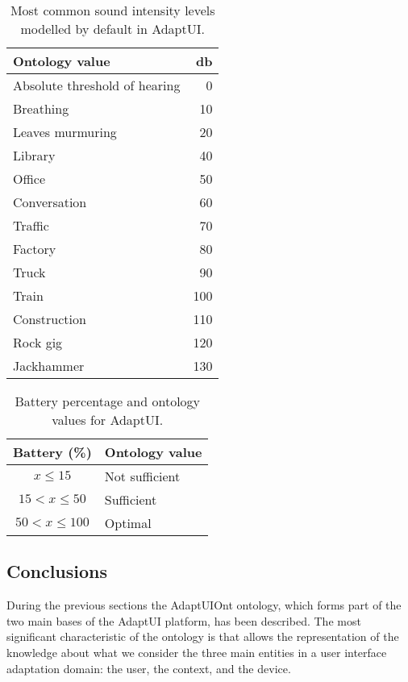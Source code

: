 \begin{table}[H]
  \caption{Most common sound intensity levels modelled by default in AdaptUI.}
 \label{tbl:sounds}
\footnotesize
\centering
 \begin{tabular}{l r}
  \hline 
  \textbf{Ontology value}	& \textbf{\ac{db}}\\
  \hline
  Absolute threshold of hearing	& 0	\\
  Breathing			& 10 	\\
  Leaves murmuring		& 20	\\
  Library			& 40	\\
  Office			& 50	\\
  Conversation			& 60	\\
  Traffic			& 70	\\
  Factory			& 80	\\
  Truck				& 90	\\
  Train				& 100	\\
  Construction			& 110	\\
  Rock gig			& 120	\\
  Jackhammer			& 130	\\
  \hline

\end{tabular}
\end{table}


\begin{table}[H]
  \caption{Battery percentage and ontology values for AdaptUI.}
 \label{tbl:batteries}
\footnotesize
\centering
 \begin{tabular}{c l}
  \hline 
  \textbf{Battery (\%)} 	& \textbf{Ontology value}	\\
  \hline  
  $x\leq15$			& Not sufficient		\\
  $15<x\leq50$			& Sufficient			\\
  $50<x\leq100$			& Optimal			\\
  \hline

\end{tabular}
\end{table}



\subsection{Conclusions}
\label{sec:model_conclusions}

During the previous sections the AdaptUIOnt ontology, which forms part of the two
main bases of the AdaptUI platform, has been described. The most significant
characteristic of the ontology is that allows the representation of the knowledge
about what we consider the three main entities in a user interface adaptation
domain: the user, the context, and the device. 

